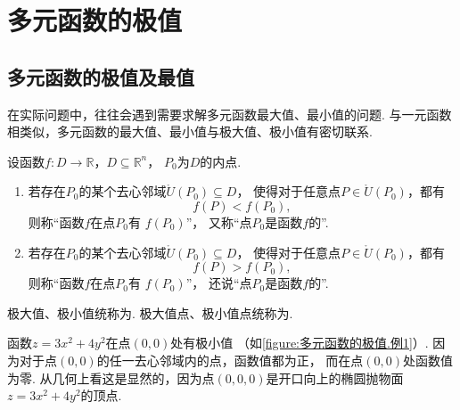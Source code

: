 \section{多元函数的极值}
\subsection{多元函数的极值及最值}
在实际问题中，往往会遇到需要求解多元函数最大值、最小值的问题.
与一元函数相类似，多元函数的最大值、最小值与极大值、极小值有密切联系.

\begin{definition}
设函数\(f\colon D \to \mathbb{R}\)，\(D \subseteq \mathbb{R}^n\)，
\(P_0\)为\(D\)的内点.
\begin{enumerate}
	\item 若存在\(P_0\)的某个去心邻域\(\mathring{U}(P_0) \subseteq D\)，
	使得对于任意点\(P \in \mathring{U}(P_0)\)，都有\[
		f(P) < f(P_0),
	\]
	则称“函数\(f\)在点\(P_0\)有 \(f(P_0)\)”，
	又称“点\(P_0\)是函数\(f\)的”.

	\item 若存在\(P_0\)的某个去心邻域\(\mathring{U}(P_0) \subseteq D\)，
	使得对于任意点\(P \in \mathring{U}(P_0)\)，都有\[
		f(P) > f(P_0),
	\]
	则称“函数\(f\)在点\(P_0\)有 \(f(P_0)\)”，
	还说“点\(P_0\)是函数\(f\)的”.
\end{enumerate}

极大值、极小值统称为.
极大值点、极小值点统称为.
\end{definition}

\begin{example}%
函数\(z=3x^2+4y^2\)在点\((0,0)\)处有极小值
（如\cref{figure:多元函数的极值.例1}）.
因为对于点\((0,0)\)的任一去心邻域内的点，函数值都为正，
而在点\((0,0)\)处函数值为零.
从几何上看这是显然的，因为点\((0,0,0)\)是开口向上的椭圆抛物面\(z=3x^2+4y^2\)的顶点.
\end{example}

